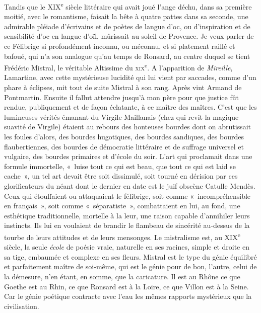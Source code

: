 \documentclass[french,twoside]{book} %
\begin{document}
Tandis que le XIX\textsuperscript{e} siècle littéraire qui avait joué l’ange déchu, dans sa première moitié, avec le romantisme, faisait la bête à quatre pattes dans sa seconde, une admirable pléiade d’écrivains et de poètes de langue d’oc, ou d’inspiration et de sensibilité d’oc en langue d’oïl, mûrissait au soleil de Provence. Je veux parler de ce Félibrige si profondément inconnu, ou méconnu, et si platement raillé et bafoué, qui n’a son analogue qu’au temps de Ronsard, au centre duquel se tient Frédéric Mistral, le véritable Altissime du \textsc{xix}\textsuperscript{e}. A l’apparition de {\itshape Mireille}, Lamartine, avec cette mystérieuse lucidité qui lui vient par saccades, comme d’un phare à éclipses, mit tout de suite Mistral à son rang. Après vint Armand de Pontmartin. Ensuite il fallut attendre jusqu’à mon père pour que justice fût rendue, publiquement et de façon éclatante, à ce maître des maîtres. C’est que les lumineuses vérités émanant du Virgile Maillanais (chez qui revit la magique suavité de Virgile) étaient au rebours des honteuses bourdes dont on abrutissait les foules d’alors, des bourdes hugotiques, des bourdes sandiques, des bourdes flaubertiennes, des bourdes de démocratie littéraire et de suffrage universel et vulgaire, des bourdes primaires et d’école du soir. L’art qui proclamait dans une formule immortelle, « luise tout ce qui est beau, que tout ce qui est laid se cache », un tel art devait être soit dissimulé, soit tourné en dérision par ces glorificateurs du néant dont le dernier en date est le juif obscène Catulle Mendès. Ceux qui étouffaient ou attaquaient le félibrige, soit comme « incompréhensible en français », soit comme « séparatiste », combattaient en lui, au fond, une esthétique traditionnelle, mortelle à la leur, une raison capable d’annihiler leurs instincts. Ils lui en voulaient de brandir le flambeau de sincérité au-dessus de la tourbe de leurs attitudes et de leurs mensonges. Le mistralisme est, au XIX\textsuperscript{e} siècle, la seule {\itshape école} de poésie vraie, naturelle en ses racines, simple et droite en sa tige, embaumée et complexe en ses fleurs. Mistral est le type du génie équilibré et parfaitement maître de soi-même, qui est le génie pour de bon, l’autre, celui de la démesure, n’en étant, en somme, que la caricature. Il est au Rhône ce que Goethe est au Rhin, ce que Ronsard est à la Loire, ce que Villon est à la Seine. Car le génie poétique contracte avec l’eau les mêmes rapports mystérieux que la civilisation.\par
\end{document}
